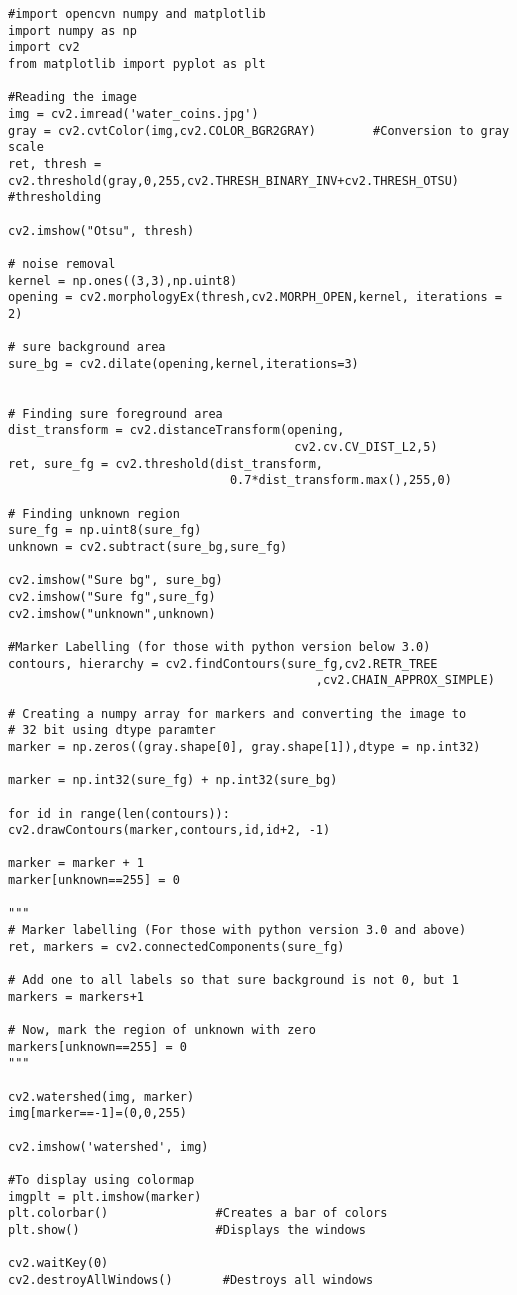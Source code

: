 \documentclass[]{article}
\begin{document}
\begin{verbatim}
#import opencvn numpy and matplotlib
import numpy as np               
import cv2
from matplotlib import pyplot as plt

#Reading the image
img = cv2.imread('water_coins.jpg')
gray = cv2.cvtColor(img,cv2.COLOR_BGR2GRAY)        #Conversion to gray scale
ret, thresh = cv2.threshold(gray,0,255,cv2.THRESH_BINARY_INV+cv2.THRESH_OTSU)   #thresholding

cv2.imshow("Otsu", thresh)

# noise removal
kernel = np.ones((3,3),np.uint8)
opening = cv2.morphologyEx(thresh,cv2.MORPH_OPEN,kernel, iterations = 2)

# sure background area
sure_bg = cv2.dilate(opening,kernel,iterations=3)


# Finding sure foreground area
dist_transform = cv2.distanceTransform(opening,
                                        cv2.cv.CV_DIST_L2,5)
ret, sure_fg = cv2.threshold(dist_transform,
                               0.7*dist_transform.max(),255,0)

# Finding unknown region
sure_fg = np.uint8(sure_fg)
unknown = cv2.subtract(sure_bg,sure_fg)

cv2.imshow("Sure bg", sure_bg)
cv2.imshow("Sure fg",sure_fg)
cv2.imshow("unknown",unknown)

#Marker Labelling (for those with python version below 3.0)
contours, hierarchy = cv2.findContours(sure_fg,cv2.RETR_TREE
                                           ,cv2.CHAIN_APPROX_SIMPLE)

# Creating a numpy array for markers and converting the image to 
# 32 bit using dtype paramter
marker = np.zeros((gray.shape[0], gray.shape[1]),dtype = np.int32)

marker = np.int32(sure_fg) + np.int32(sure_bg)

for id in range(len(contours)):
cv2.drawContours(marker,contours,id,id+2, -1)

marker = marker + 1
marker[unknown==255] = 0

"""
# Marker labelling (For those with python version 3.0 and above)
ret, markers = cv2.connectedComponents(sure_fg)

# Add one to all labels so that sure background is not 0, but 1
markers = markers+1

# Now, mark the region of unknown with zero
markers[unknown==255] = 0
"""

cv2.watershed(img, marker)
img[marker==-1]=(0,0,255)

cv2.imshow('watershed', img)

#To display using colormap
imgplt = plt.imshow(marker)
plt.colorbar()               #Creates a bar of colors
plt.show()                   #Displays the windows

cv2.waitKey(0)
cv2.destroyAllWindows()       #Destroys all windows

\end{verbatim}
\end{document}
